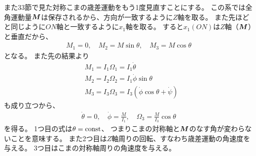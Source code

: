 \documentclass[a4paper]{jsarticle}
\def\vec#1{\mbox{\boldmath $#1$}}
\begin{document}
また33節で見た対称こまの歳差運動をもう1度見直すことにする。
この系では全角運動量$\vec{M}$は保存されるから、方向が一致するように$Z$軸を取る。
また先ほどと同じように$ON$軸と一致するように$x_1$軸を取る。
すると$x_1(ON)$は$Z$軸（$\vec{M}$）と垂直だから、
\begin{align}
	M_1 = 0, \quad M_2 = M \sin \theta, \quad M_3 = M \cos \theta
\end{align}
となる。
また先の結果より
\begin{align}
	&M_1 = I_1 \Omega_1 = I_1 \dot{\theta} \\
	&M_2 = I_2 \Omega_2 = I_1 \dot{\phi} \sin \theta \\
	&M_3 = I_3 \Omega_3 = I_3 \left( \dot{\phi} \cos \theta + \dot{\psi} \right)
\end{align}
も成り立つから、
\begin{align}
	\dot{\theta} = 0, \quad \dot{\phi} = \frac{M}{I_1}, \quad
	\Omega_3 = \frac{M}{I_3} \cos \theta
\end{align}
を得る。
1つ目の式は$\theta = {\rm const}$、
つまりこまの対称軸と$\vec{M}$のなす角が変わらないことを意味する。
また2つ目は$Z$軸周りの回転、すなわち歳差運動の角速度を与える。
3つ目はこまの対称軸周りの角速度を与える。
\end{document}
